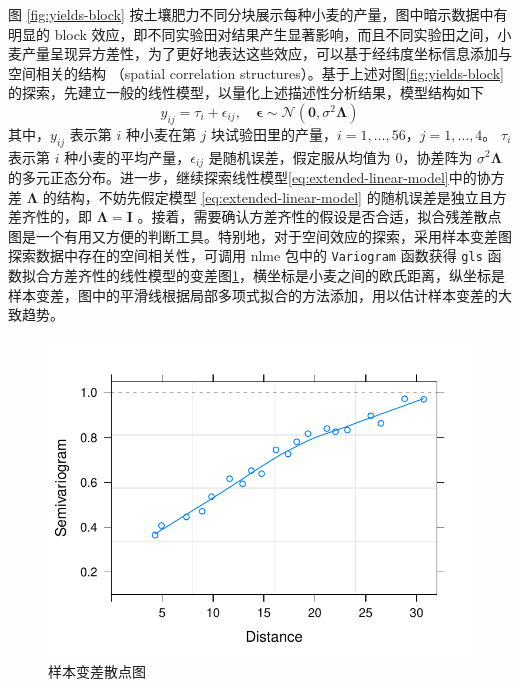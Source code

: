 \documentclass[12pt,a4paper,UTF8,twoside]{book}
\theoremstyle{definition}
\theoremstyle{definition}
\theoremstyle{definition}
\theoremstyle{remark}
\begin{document}
图 \ref{fig:yields-block} 按土壤肥力不同分块展示每种小麦的产量，图中暗示数据中有明显的 block 效应，即不同实验田对结果产生显著影响，而且不同实验田之间，小麦产量呈现异方差性，为了更好地表达这些效应，可以基于经纬度坐标信息添加与空间相关的结构 （spatial correlation structures）。基于上述对图\ref{fig:yields-block} 的探索，先建立一般的线性模型，以量化上述描述性分析结果，模型结构如下
\begin{equation}
y_{ij} = \tau_i + \epsilon_{ij}, \quad \boldsymbol{\epsilon} \sim \mathcal{N}(\mathbf{0},\sigma^2 \boldsymbol{\Lambda}) \label{eq:extended-linear-model}
\end{equation}
\noindent 其中，\(y_{ij}\) 表示第 \(i\) 种小麦在第 \(j\) 块试验田里的产量，\(i = 1,\ldots,56\)，\(j = 1,\ldots,4\)。 \(\tau_i\) 表示第 \(i\) 种小麦的平均产量，\(\epsilon_{ij}\) 是随机误差，假定服从均值为 0，协差阵为 \(\sigma^2 \boldsymbol{\Lambda}\) 的多元正态分布。进一步，继续探索线性模型\eqref{eq:extended-linear-model}中的协方差 \(\boldsymbol{\Lambda}\) 的结构，不妨先假定模型 \eqref{eq:extended-linear-model} 的随机误差是独立且方差齐性的，即 \(\boldsymbol{\Lambda} = \boldsymbol{I}\) 。接着，需要确认方差齐性的假设是否合适，拟合残差散点图是一个有用又方便的判断工具。特别地，对于空间效应的探索，采用样本变差图探索数据中存在的空间相关性，可调用 nlme 包中的 \texttt{Variogram} 函数获得 \texttt{gls} 函数拟合方差齐性的线性模型的变差图\ref{fig:yields-variogram}，横坐标是小麦之间的欧氏距离，纵坐标是样本变差，图中的平滑线根据局部多项式拟合的方法添加，用以估计样本变差的大致趋势。

\begin{figure}

{\centering \includegraphics[width=0.7\linewidth]{figures/Yields-Variogram} 

}

\caption{样本变差散点图}\label{fig:yields-variogram}
\end{figure}
\end{document}
